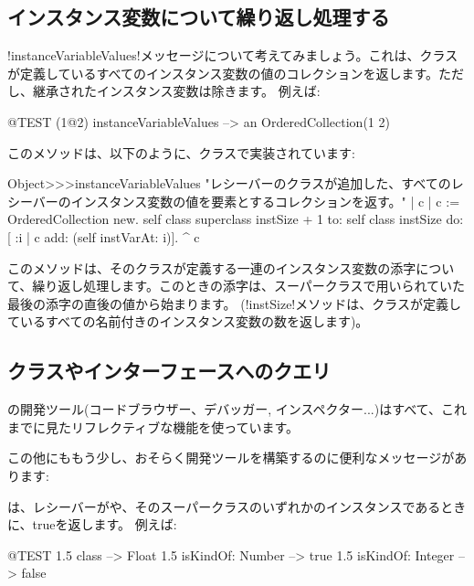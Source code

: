 \documentclass[a4paper,10pt,twoside]{book}
\begin{document}
\subsection{インスタンス変数について繰り返し処理する}

\ct!instanceVariableValues!メッセージについて考えてみましょう。これは、クラスが定義しているすべてのインスタンス変数の値のコレクションを返します。ただし、継承されたインスタンス変数は除きます。
例えば:
\begin{code}{@TEST}
(1@2) instanceVariableValues --> an OrderedCollection(1 2)
\end{code}

このメソッドは、以下のように、クラスで実装されています: %
\begin{code}{}
Object>>>instanceVariableValues
	"レシーバーのクラスが追加した、すべてのレシーバーのインスタンス変数の値を要素とするコレクションを返す。"	
	| c |
	c := OrderedCollection new.
	self class superclass instSize + 1
		to: self class instSize
		do: [ :i | c add: (self instVarAt: i)].
	^ c
\end{code}

このメソッドは、そのクラスが定義する一連のインスタンス変数の添字について、繰り返し処理します。このときの添字は、スーパークラスで用いられていた最後の添字の直後の値から始まります。
(\ct!instSize!メソッドは、クラスが定義しているすべての名前付きのインスタンス変数の数を返します)。

\subsection{クラスやインターフェースへのクエリ}

\pharo の開発ツール(コードブラウザー、デバッガー, インスペクター...)はすべて、これまでに見たリフレクティブな機能を使っています。

この他にももう少し、おそらく開発ツールを構築するのに便利なメッセージがあります:

は、レシーバーがや、そのスーパークラスのいずれかのインスタンスであるときに、trueを返します。
例えば:
\begin{code}{@TEST}
1.5 class                     --> Float
1.5 isKindOf: Number --> true
1.5 isKindOf: Integer   --> false
\end{code}
\end{document}
